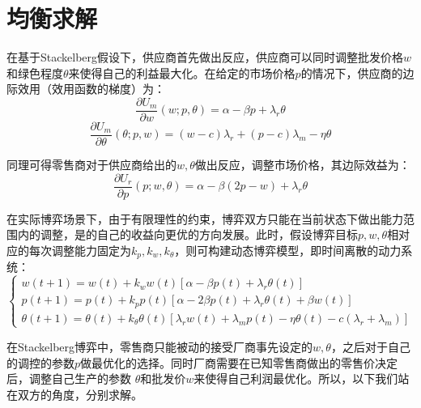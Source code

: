 \documentclass{article}
\begin{document}
\section{均衡求解}
\par 在基于Stackelberg假设下，供应商首先做出反应，供应商可以同时调整批发价格$w$和绿色程度$\theta$来使得自己的利益最大化。在给定的市场价格$p$的情况下，供应商的边际效用（效用函数的梯度）为：
\begin{equation}
    \frac{\partial U_m}{\partial w}(w;p,\theta)=\alpha-\beta p+\lambda_r\theta
\end{equation}
\begin{equation}
    \frac{\partial U_m}{\partial \theta}(\theta;p,w)=(w-c)\lambda_r+(p-c)\lambda_m-\eta\theta
\end{equation}
\par 同理可得零售商对于供应商给出的$w,\theta$做出反应，调整市场价格，其边际效益为：
\begin{equation}
    \frac{\partial U_r}{\partial p}(p;w,\theta)=\alpha-\beta (2p-w)+\lambda_r\theta
\end{equation}
\par 在实际博弈场景下，由于有限理性的约束，博弈双方只能在当前状态下做出能力范围内的调整，是的自己的收益向更优的方向发展。此时，假设博弈目标$p, w, \theta$相对应的每次调整能力固定为$k_p, k_w, k_\theta$，则可构建动态博弈模型，即时间离散的动力系统：
\begin{equation}\label{iteration}
    \left\{  
        \begin{array}{lr}
            w(t+1)=w(t)+k_ww(t)[\alpha-\beta p(t)+\lambda_r\theta(t)]               \\  
            p(t+1)=p(t)+k_pp(t)[\alpha-2\beta p(t)+\lambda_r\theta(t)+\beta w(t)]   \\  
            \theta(t+1)=\theta(t)+k_\theta\theta(t)[\lambda_rw(t)+\lambda_mp(t)-\eta\theta(t)-c(\lambda_r+\lambda_m)]
        \end{array}  
    \right.
\end{equation}  
\par 在Stackelberg博弈中，零售商只能被动的接受厂商事先设定的$w, \theta$，之后对于自己的调控的参数$p$做最优化的选择。同时厂商需要在已知零售商做出的零售价决定后，调整自己生产的参数 $\theta$和批发价$w$来使得自己利润最优化。所以，以下我们站在双方的角度，分别求解。
\end{document}
